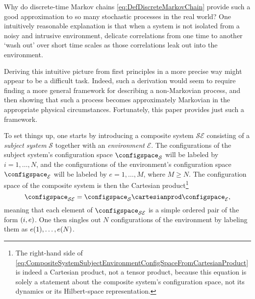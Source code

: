 \documentclass[12pt,english,prl,superscriptaddress,nobibnotes,nofootinbib]{revtex4-2}
\let\originalleft\left
\let\originalright\right
\renewcommand{\left}{\mathopen{}\mathclose\bgroup\originalleft}
\renewcommand{\right}{\aftergroup\egroup\originalright}
\begin{document}
Why do discrete-time Markov chains \eqref{eq:DefDiscreteMarkovChain}
provide such a good approximation to so many stochastic processes
in the real world? One intuitively reasonable explanation is that
when a system is not isolated from a noisy and intrusive environment,
delicate correlations from one time to another \textquoteleft wash
out\textquoteright{} over short time scales as those correlations
leak out into the environment.

Deriving this intuitive picture from first principles in a more precise
way might appear to be a difficult task. Indeed, such a derivation
would seem to require finding a more general framework for describing
a non-Markovian process, and then showing that such a process becomes
approximately Markovian in the appropriate physical circumstances.
Fortunately, this paper provides just such a framework.

To set things up, one starts by introducing a composite system $\mathcal{S}\mathcal{E}$
consisting of a \emph{subject system} $\mathcal{S}$ together with
an \emph{environment} $\mathcal{E}$. The configurations of the subject
system's configuration space $\configspace_{\mathcal{S}}$ will be
labeled by $i=1,\dots,N$, and the configurations of the environment's
configuration space $\configspace_{\mathcal{E}}$ will be labeled
by $e=1,\dots,M$, where $M\geq N$. The configuration space of the
composite system is then the Cartesian product\footnote{The right-hand side of \eqref{eq:CompositeSystemSubjectEnvironmentConfigSpaceFromCartesianProduct}
is indeed a Cartesian product, not a tensor product, because this
equation is solely a statement about the composite system's configuration
space, not its dynamics or its Hilbert-space representation.} 
\begin{equation}
\configspace_{\mathcal{S}\mathcal{E}}=\configspace_{\mathcal{S}}\cartesianprod\configspace_{\mathcal{E}},\label{eq:CompositeSystemSubjectEnvironmentConfigSpaceFromCartesianProduct}
\end{equation}
 meaning that each element of $\configspace_{\mathcal{S}\mathcal{E}}$
is a simple ordered pair of the form $\left(i,e\right)$. One then
singles out $N$ configurations of the environment by labeling them
as $e\left(1\right),\dots,e\left(N\right)$.
\end{document}

